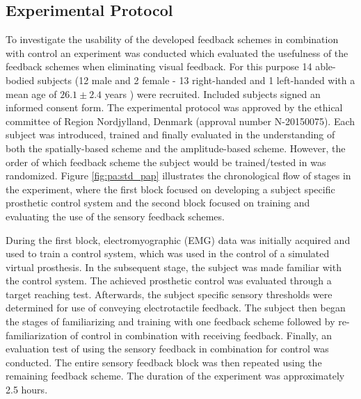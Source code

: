 \subsection{Experimental Protocol}

To investigate the usability of the developed feedback schemes in combination with control an experiment was conducted which evaluated the usefulness of the feedback schemes when eliminating visual feedback. For this purpose 14 able-bodied subjects (12 male and 2 female - 13 right-handed and 1 left-handed with a mean age of $26.1 \pm 2.4$ years ) were recruited. Included subjects signed an informed consent form. The experimental protocol was approved by the ethical committee of Region Nordjylland, Denmark (approval number N-20150075). Each subject was introduced, trained and finally evaluated in the understanding of both the spatially-based scheme and the amplitude-based scheme. However, the order of which feedback scheme the subject would be trained/tested in was randomized. Figure \ref{fig:pa:std_pap} illustrates the chronological flow of stages in the experiment, where the first block focused on developing a subject specific prosthetic control system and the second block focused on training and evaluating the use of the sensory feedback schemes.

During the first block, electromyographic (EMG) data was initially acquired and used to train a control system, which was used in the control of a simulated virtual prosthesis. In the subsequent stage, the subject was made familiar with the control system. The achieved prosthetic control was evaluated through a target reaching test. Afterwards, the subject specific sensory thresholds were determined for use of conveying electrotactile feedback. The subject then began the stages of familiarizing and training with one feedback scheme followed by re-familiarization of control in combination with receiving feedback. Finally, an evaluation test of using the sensory feedback in combination for control was conducted. The entire sensory feedback block was then repeated using the remaining feedback scheme. The duration of the experiment was approximately 2.5 hours.  



